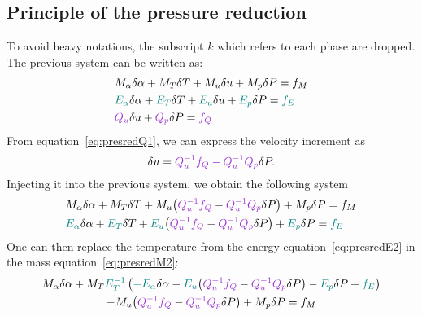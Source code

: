 \subsection{Principle of the pressure reduction}
To avoid heavy notations, the subscript $k$ which refers to each phase are dropped. The previous system can be written as:
\begin{align}
    &M_{\alpha}\delta \alpha +M_T \delta T +M_u\delta u +M_p \delta P=f_M\label{eq:presredM1}\\
    &{\color{myteal}E_{\alpha}}\delta \alpha +{\color{myteal} E_T} \delta T +{\color{myteal} E_u}\delta u +{\color{myteal}E_p} \delta P={\color{myteal}f_E}\label{eq:presredE1}\\
    &{\color{mydarkorchid} Q_u} \delta u+{\color{mydarkorchid} Q_p} \delta P={\color{mydarkorchid} f_Q} \label{eq:presredQ1}
\end{align}
From equation~\eqref{eq:presredQ1}, we can express the velocity increment as 
\begin{equation}
\delta u = {\color{mydarkorchid}Q_u^{-1}f_Q-Q_u^{-1}Q_p}\delta P.
\end{equation}
Injecting it into the previous system, we obtain the following system
\begin{align}
    &M_{\alpha}\delta \alpha + M_T \delta T + M_u{\parent{{\color{mydarkorchid}Q_u^{-1}f_Q} - {\color{mydarkorchid} Q_u^{-1}Q_p}\delta P}} + M_p \delta P = f_M\label{eq:presredM2}\\
    &{\color{myteal} E_{\alpha}}\delta \alpha + {\color{myteal} E_T} \delta T + {\color{myteal} E_u}{\parent{{\color{mydarkorchid}Q_u^{-1}f_Q} - {\color{mydarkorchid}Q_u^{-1}Q_p}\delta P}} + {\color{myteal} E_p} \delta P = {\color{myteal}f_E}\label{eq:presredE2}
\end{align}
One can then replace the temperature from the energy equation~\eqref{eq:presredE2} in the mass equation~\eqref{eq:presredM2}:
\begin{multline}
    M_{\alpha}\delta \alpha + M_T {{\color{myteal}E_T^{-1}}\parent{{\color{myteal}-E_{\alpha}}\delta \alpha - {\color{myteal}E_u}{\parent{{\color{mydarkorchid}Q_u^{-1}f_Q} - {\color{mydarkorchid}Q_u^{-1}Q_p}\delta P}} - {\color{myteal}E_p} \delta P + {\color{myteal}f_E}}}\\
    - M_u{\parent{{\color{mydarkorchid}Q_u^{-1}f_Q} - {\color{mydarkorchid}Q_u^{-1}Q_p}\delta P}} + M_p \delta P = f_M
\end{multline}
